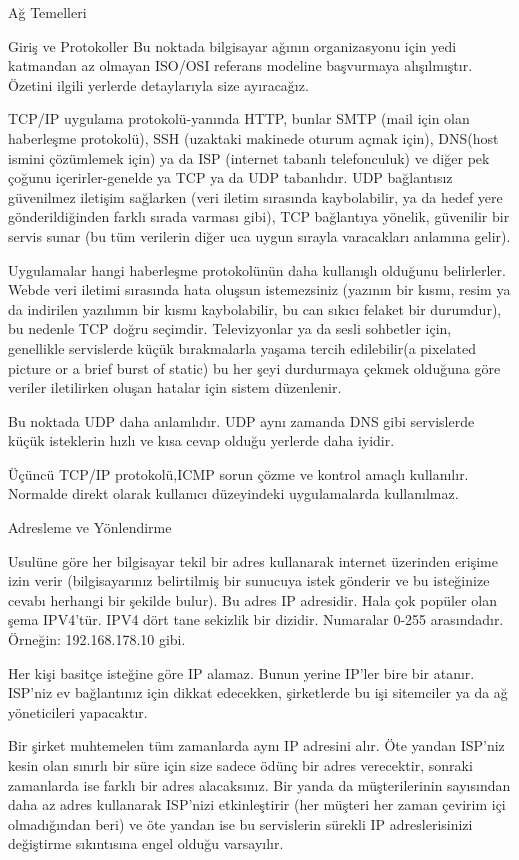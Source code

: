 \begin{section}{Ağ Temelleri}
\begin{subsection}{Giriş ve Protokoller}
Bu noktada bilgisayar ağının organizasyonu için yedi katmandan az olmayan ISO/OSI referans modeline başvurmaya alışılmıştır. Özetini ilgili yerlerde detaylarıyla size ayıracağız.

TCP/IP uygulama protokolü-yanında HTTP, bunlar SMTP (mail için olan haberleşme protokolü), SSH (uzaktaki makinede oturum açmak için), DNS(host ismini çözümlemek için) ya da ISP (internet tabanlı telefonculuk) ve diğer pek çoğunu içerirler-genelde ya TCP ya da UDP tabanlıdır. UDP bağlantısız güvenilmez iletişim sağlarken (veri iletim sırasında kaybolabilir, ya da hedef yere gönderildiğinden farklı sırada varması gibi), TCP bağlantıya yönelik, güvenilir bir servis sunar (bu tüm verilerin diğer uca uygun sırayla varacakları anlamına gelir).

Uygulamalar hangi haberleşme protokolünün daha kullanışlı olduğunu belirlerler. Webde veri iletimi sırasında hata oluşsun istemezsiniz (yazının bir kısmı, resim ya da indirilen yazılımın bir kısmı kaybolabilir, bu can sıkıcı felaket bir durumdur), bu nedenle TCP doğru seçimdir. Televizyonlar ya da sesli sohbetler için, genellikle servislerde küçük bırakmalarla yaşama tercih edilebilir(a pixelated picture or a brief burst of static) bu her şeyi durdurmaya çekmek olduğuna göre veriler iletilirken oluşan hatalar için sistem düzenlenir.

Bu noktada UDP daha anlamlıdır. UDP aynı zamanda DNS gibi servislerde küçük isteklerin hızlı ve kısa cevap olduğu yerlerde daha iyidir.

Üçüncü TCP/IP protokolü,ICMP sorun çözme ve kontrol amaçlı kullanılır. Normalde direkt olarak kullanıcı düzeyindeki uygulamalarda kullanılmaz.
\end{subsection}
\begin{subsection}{Adresleme ve Yönlendirme}

Usulüne göre her bilgisayar tekil bir adres kullanarak internet üzerinden erişime izin verir (bilgisayarınız belirtilmiş bir sunucuya istek gönderir ve bu isteğinize cevabı herhangi bir şekilde bulur). Bu adres IP adresidir. Hala çok popüler olan şema IPV4'tür. IPV4 dört tane sekizlik bir dizidir. Numaralar 0-255 arasındadır. Örneğin: 192.168.178.10 gibi. 

Her kişi basitçe isteğine göre IP alamaz. Bunun yerine IP'ler bire bir atanır. ISP'niz ev bağlantınız için dikkat edecekken, şirketlerde bu işi sitemciler ya da ağ yöneticileri yapacaktır.

Bir şirket muhtemelen tüm zamanlarda aynı IP adresini alır. Öte yandan ISP'niz kesin olan sınırlı bir süre için size sadece ödünç bir adres verecektir, sonraki zamanlarda ise farklı bir adres alacaksınız. Bir yanda da müşterilerinin sayısından daha az adres kullanarak ISP'nizi etkinleştirir (her müşteri her zaman çevirim içi olmadığından beri) ve öte yandan ise bu servislerin sürekli IP adreslerisinizi değiştirme sıkıntısına engel olduğu varsayılır.


\end{subsection}
\end{section}
